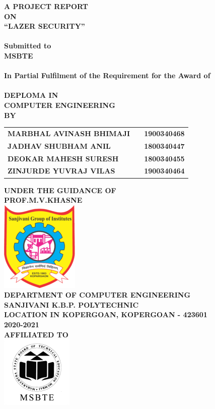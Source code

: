 \newpage
\begin{center}
\thispagestyle{empty}
\large{\textbf{A PROJECT REPORT\\ON}}\\[0.3cm]
\LARGE{\textsc {\textbf{\color{blue}``LAZER SECURITY''}}}\\
\Large{\textbf{\\Submitted to}}
\LARGE{\textbf{\\MSBTE\\}}
\large{\textbf{\\In Partial Fulfilment of the Requirement for the Award of\\}}
\Large{\textbf{\\DEPLOMA IN\\ \color{magenta}COMPUTER ENGINEERING}}
\vspace{0.3cm}
\Large{\textbf{\\BY}}\\[0.3cm]
\begin{table}[h]
\centering
\large{
\begin{tabular}{>{\bfseries}lc>{\bfseries}r}
MARBHAL AVINASH BHIMAJI & & 1900340468\\JADHAV SHUBHAM ANIL & & 1800340447\\DEOKAR MAHESH SURESH & & 1800340455\\ZINJURDE YUVRAJ VILAS & &  1900340464\\
\end{tabular}}
\end{table}
\large{\textbf{UNDER THE GUIDANCE OF}}\\
\large{\textbf{PROF.M.V.KHASNE}}\\[0.5cm]
\includegraphics[scale=0.6]{project/images/kbp}\\
\large{\textbf{DEPARTMENT OF COMPUTER ENGINEERING}}\\
\Large{\textbf{\color{orange}SANJIVANI K.B.P. POLYTECHNIC}}\\
\large{\textbf{LOCATION IN KOPERGOAN, KOPERGOAN - 423601}}
\large{\textbf{\\ \color{cyan}2020-2021}}\\[0.3cm]
\Large{\textbf{\color{green}AFFILIATED TO}}\\[0.3cm]
\includegraphics[scale=1.1]{project/images/mahesh}

\newpage

\end{center}